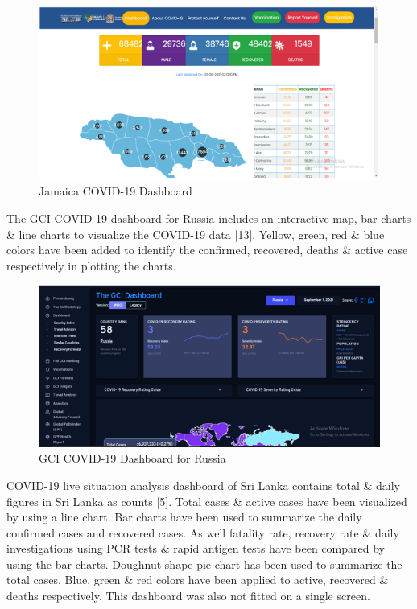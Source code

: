 \documentclass[
]{article}
\begin{document}
\begin{figure}
\includegraphics[width=8.35in]{Images/11} \caption{Jamaica COVID-19 Dashboard}\label{fig:unnamed-chunk-18}
\end{figure}

The GCI COVID-19 dashboard for Russia includes an interactive map, bar
charts \& line charts to visualize the COVID-19 data {[}13{]}. Yellow,
green, red \& blue colors have been added to identify the confirmed,
recovered, deaths \& active case respectively in plotting the charts.

\begin{figure}
\includegraphics[width=8.25in]{Images/12} \caption{GCI COVID-19 Dashboard for Russia}\label{fig:unnamed-chunk-19}
\end{figure}

COVID-19 live situation analysis dashboard of Sri Lanka contains total
\& daily figures in Sri Lanka as counts {[}5{]}. Total cases \& active
cases have been visualized by using a line chart. Bar charts have been
used to summarize the daily confirmed cases and recovered cases. As well
fatality rate, recovery rate \& daily investigations using PCR tests \&
rapid antigen tests have been compared by using the bar charts. Doughnut
shape pie chart has been used to summarize the total cases. Blue, green
\& red colors have been applied to active, recovered \& deaths
respectively. This dashboard was also not fitted on a single screen.
\end{document}
